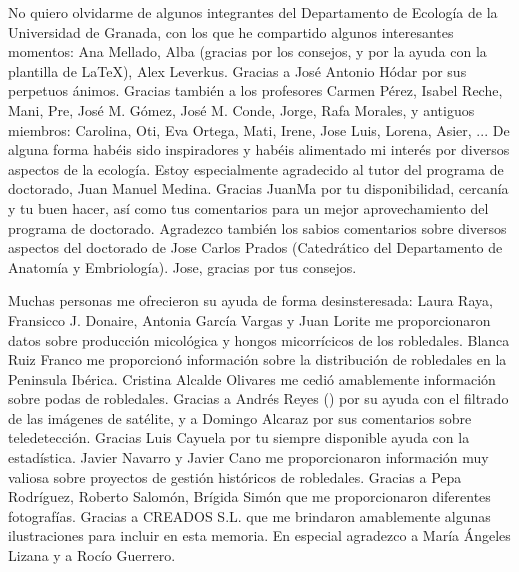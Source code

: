 No quiero olvidarme de algunos integrantes del Departamento de Ecología de la Universidad de Granada, con los que he compartido algunos interesantes momentos: Ana Mellado, Alba (gracias por los consejos, y por la ayuda con la plantilla de \LaTeX{}), Alex Leverkus. Gracias a José Antonio Hódar por sus perpetuos ánimos. Gracias también a los profesores Carmen Pérez, Isabel Reche, Mani, Pre, José M. Gómez, José M. Conde, Jorge, Rafa Morales, y antiguos miembros: Carolina, Oti, Eva Ortega, Mati, Irene, Jose Luis, Lorena, Asier, ... De alguna forma habéis sido inspiradores y habéis alimentado mi interés por diversos aspectos de la ecología. Estoy especialmente agradecido al tutor del programa de doctorado, Juan Manuel Medina. Gracias JuanMa por tu disponibilidad, cercanía y tu buen hacer, así como tus comentarios para un mejor aprovechamiento del programa de doctorado. Agradezco también los sabios comentarios sobre diversos aspectos del doctorado de Jose Carlos Prados (Catedrático del Departamento de Anatomía y Embriología). Jose, gracias por tus consejos. 

Muchas personas me ofrecieron su ayuda de forma desinsteresada: Laura Raya, Fransicco J. Donaire, Antonia García Vargas y Juan Lorite me proporcionaron datos sobre producción micológica y hongos micorrícicos de los robledales. Blanca Ruiz Franco me proporcionó información sobre la distribución de robledales en la Peninsula Ibérica. Cristina Alcalde Olivares me cedió amablemente información sobre podas de robledales. Gracias a Andrés Reyes (\dag) por su ayuda con el filtrado de las imágenes de satélite, y a Domingo Alcaraz por sus comentarios sobre teledetección. Gracias Luis Cayuela por tu siempre disponible ayuda con la estadística. Javier Navarro y Javier Cano me proporcionaron información muy valiosa sobre proyectos de gestión históricos de robledales. Gracias a Pepa Rodríguez, Roberto Salomón, Brígida Simón que me proporcionaron diferentes fotografías. Gracias a CREADOS S.L. que me brindaron amablemente algunas ilustraciones para incluir en esta memoria. En especial agradezco a María Ángeles Lizana y a Rocío Guerrero. 

